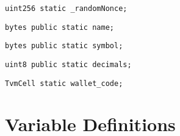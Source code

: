 \begin{lstlisting}[firstnumber=29]
    uint256 static _randomNonce;
\end{lstlisting}

\begin{lstlisting}[firstnumber=31]
    bytes public static name;
\end{lstlisting}

\begin{lstlisting}[firstnumber=32]
    bytes public static symbol;
\end{lstlisting}

\begin{lstlisting}[firstnumber=33]
    uint8 public static decimals;
\end{lstlisting}

\begin{lstlisting}[firstnumber=35]
    TvmCell static wallet_code;
\end{lstlisting}

\section{Variable Definitions}


